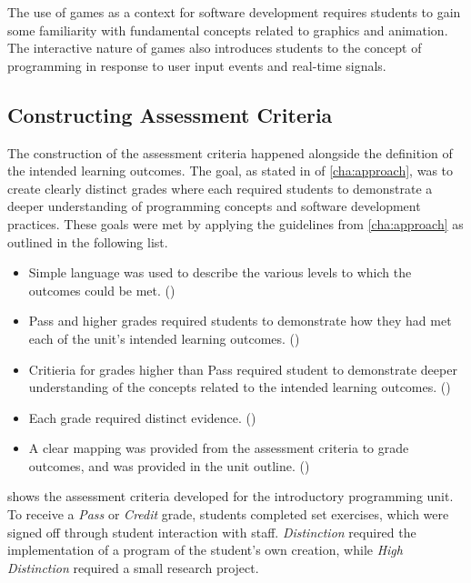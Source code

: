 The use of games as a context for software development requires students to gain some familiarity with fundamental concepts related to graphics and animation. The interactive nature of games also introduces students to the concept of programming in response to user input events and real-time signals.

\clearpage
\subsection{Constructing Assessment Criteria} %
\label{sub:intro_constructing_assessment_criteria}

The construction of the assessment criteria happened alongside the definition of the intended learning outcomes. The goal, as stated in  of \cref{cha:approach}, was to create clearly distinct grades where each required students to demonstrate a deeper understanding of programming concepts and software development practices. These goals were met by applying the guidelines from \cref{cha:approach} as outlined in the following list.

\begin{itemize}[noitemsep,nolistsep]
	\item Simple language was used to describe the various levels to which the outcomes could be met. ()
	\item Pass and higher grades required students to demonstrate how they had met each of the unit's intended learning outcomes. ()
	\item Critieria for grades higher than Pass required student to demonstrate deeper understanding of the concepts related to the intended learning outcomes. ()
	\item Each grade required distinct evidence. ()
	\item A clear mapping was provided from the assessment criteria to grade outcomes, and was provided in the unit outline. ()
\end{itemize}


 shows the assessment criteria developed for the introductory programming unit. To receive a \emph{Pass} or \emph{Credit} grade, students completed set exercises, which were signed off through student interaction with staff. \emph{Distinction} required the implementation of a program of the student's own creation, while \emph{High Distinction} required a small research project.

